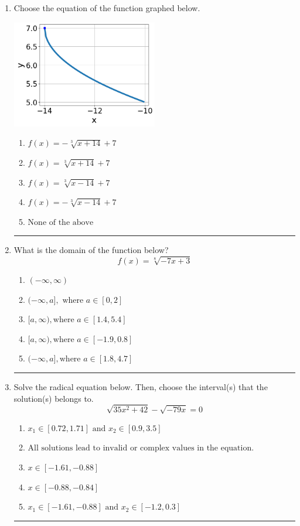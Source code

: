 \documentclass[14pt]{extbook}
\newcommand{\litem}[1]{\item#1\hspace*{-1cm}\rule{\textwidth}{0.4pt}}
\begin{document}
\begin{enumerate}
{\begin{enumerate}[label=\Alph*.]
\end{enumerate} }
\litem{
Choose the equation of the function graphed below.
\begin{center}
    \includegraphics[width=0.5\textwidth]{../Figures/radicalGraphToEquationCopyC.png}
\end{center}
\begin{enumerate}[label=\Alph*.]
\item \( f(x) = - \sqrt[3]{x + 14} + 7 \)
\item \( f(x) = \sqrt[3]{x + 14} + 7 \)
\item \( f(x) = \sqrt[3]{x - 14} + 7 \)
\item \( f(x) = - \sqrt[3]{x - 14} + 7 \)
\item \( \text{None of the above} \)

\end{enumerate} }
\litem{
What is the domain of the function below?\[ f(x) = \sqrt[8]{-7 x + 3} \]\begin{enumerate}[label=\Alph*.]
\item \( (-\infty, \infty) \)
\item \( (-\infty, a], \text{ where } a \in [0, 2] \)
\item \( [a, \infty), \text{where } a \in [1.4, 5.4] \)
\item \( [a, \infty), \text{where } a \in [-1.9, 0.8] \)
\item \( (-\infty, a], \text{where } a \in [1.8, 4.7] \)

\end{enumerate} }
\litem{
Solve the radical equation below. Then, choose the interval(s) that the solution(s) belongs to.\[ \sqrt{35 x^2 + 42} - \sqrt{-79 x} = 0 \]\begin{enumerate}[label=\Alph*.]
\item \( x_1 \in [0.72, 1.71] \text{ and } x_2 \in [0.9,3.5] \)
\item \( \text{All solutions lead to invalid or complex values in the equation.} \)
\item \( x \in [-1.61,-0.88] \)
\item \( x \in [-0.88,-0.84] \)
\item \( x_1 \in [-1.61, -0.88] \text{ and } x_2 \in [-1.2,0.3] \)


\end{enumerate}}
\end{enumerate}
\end{document}
